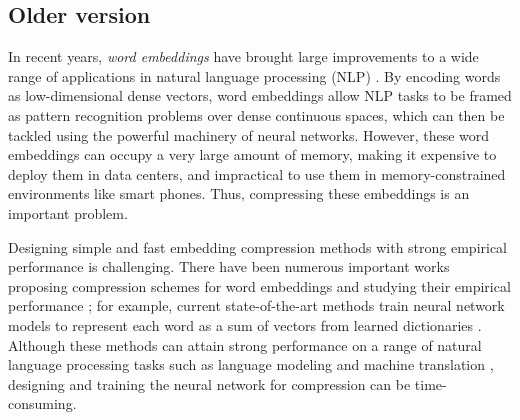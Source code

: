 


\subsection{Older version}
In recent years, \textit{word embeddings} \citep{word2vec13,glove14,fasttext18} have brought large improvements to a wide range of applications in natural language processing (NLP) \citep{collins16,drqa17}.
By encoding words as low-dimensional dense vectors, word embeddings allow NLP tasks to be framed as pattern recognition problems over dense continuous spaces, which can then be tackled using the powerful machinery of neural networks.
However, these word embeddings can occupy a very large amount of memory, making it expensive to deploy them in data centers, and impractical to use them in memory-constrained environments like smart phones.
Thus, compressing these embeddings is an important problem.

Designing simple and fast embedding compression methods with strong empirical performance is challenging.
There have been numerous important works proposing compression schemes for word embeddings and studying their empirical performance \citep{sparse16,andrews16,dccl17,kway18};
for example, current state-of-the-art methods train neural network models to represent each word as a sum of vectors from learned dictionaries \citep{dccl17,kway18}.
Although these methods can attain strong performance on a range of natural language processing tasks such as language modeling \citep{mikolov10} and machine translation \citep{bahdanau15}, designing and training the neural network for compression can be time-consuming.


